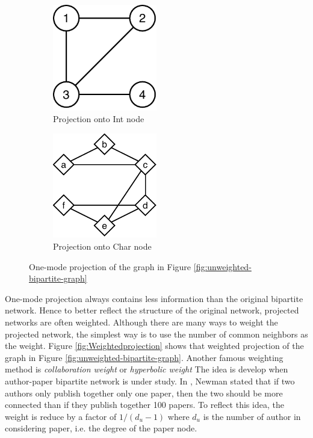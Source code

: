 \begin{figure}[H]
	\centering
	\begin{subfigure}[b]{0.4\textwidth}
		\centering
		\includegraphics[width=0.5\textwidth]{images/bipartite-projection-number.pdf}
		\caption{Projection onto Int node}
		\label{fig:Intprojection}
	\end{subfigure}
	\begin{subfigure}[b]{0.4\textwidth}
		\centering
		\includegraphics[width=0.5\textwidth]{images/bipartite-projection-char.pdf}
		\caption{Projection onto Char node}
		\label{fig:Charprojection}
	\end{subfigure}
	\caption{One-mode projection of the graph in Figure \ref{fig:unweighted-bipartite-graph}}
	\label{fig:projection}
\end{figure}

One-mode projection always contains less information than the original bipartite network.
Hence to better reflect the structure of the original network,
projected networks are often weighted.
Although there are many ways to weight the projected network,
the simplest way is to use the number of common neighbors as the weight.
Figure \ref{fig:Weightedprojection} shows that weighted projection of the graph in Figure \ref{fig:unweighted-bipartite-graph}.
Another famous weighting method is \textit{collaboration weight} or \textit{hyperbolic weight}
The idea is develop when author-paper bipartite network is under study.
In \parencite{newman2001}, Newman stated that if two authors only publish together only one paper,
then the two should be more connected than if they publish together 100 papers.
To reflect this idea, the weight is reduce by a factor of $1/(d_u-1)$
where $d_u$ is the number of author in considering paper, i.e. the degree of the paper node.

